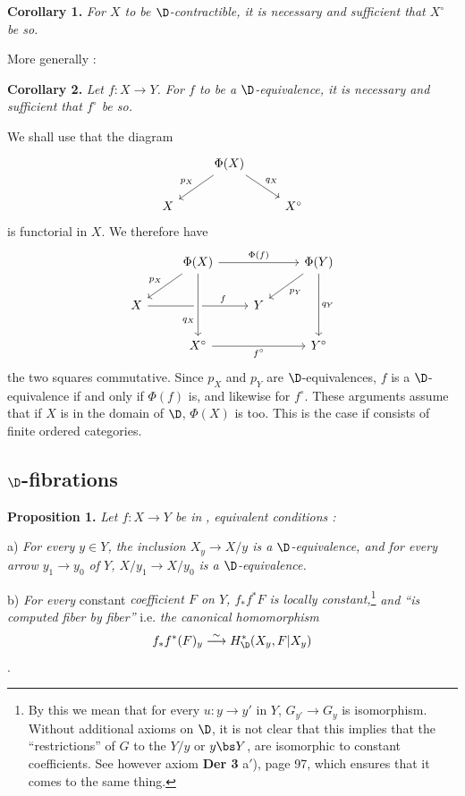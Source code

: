 \textbf{Corollary 1.} \textit{For $X$ to be $\D$-contractible, it is necessary and sufficient that $X^\circ$ be so.}

\hspace*{\parindent}More generally :

\textbf{Corollary 2.} \textit{Let $f : X \to Y$. For $f$ to be a $\D$-equivalence, it is necessary and sufficient that $f^\circ$ be so.}

\hspace*{\parindent}We shall use that the diagram
\[
\begin{tikzcd}
& \Phi(X) \arrow[dl, "p_X"'] \arrow[dr, "q_X"] & \\
X & & X^\circ
\end{tikzcd}
\]
is functorial in $X$. We therefore have
\[
\begin{tikzcd}
& \Phi(X) \arrow[rr, "\Phi(f)"] \arrow[dl, "p_X"'] & & \Phi(Y) \arrow[dl, "p_Y"] \arrow[dd, "q_Y"] \\
X \arrow[rr, "f" near end] \arrow[from=1-2, to=3-2, "q_X"' near end, crossing over] & & Y & \\
& X^\circ \arrow[rr, "f^\circ"'] & & Y^\circ
\end{tikzcd}
\]
the two squares commutative. Since $p_X$ and $p_Y$ are $\D$-equivalences, $f$ is a $\D$-equivalence if and only if $\Phi(f)$ is, and likewise for $f^\circ$. These arguments assume that if $X$ is in the domain of $\D$, $\Phi(X)$ is too. This is the case if \Dia{} consists of finite ordered categories.


\subsection*{$\D$-fibrations}

\textbf{Proposition 1.} \textit{Let $f : X \to Y$ be in} \Dia\textit{, equivalent conditions :}

\hspace*{\parindent}a) \textit{For every $y \in Y$, the inclusion $X_y \to X/y$ is a $\D$-equivalence, and for every arrow $y_1 \to y_0$ of $Y$, $X/y_1 \to X/y_0$ is a $\D$-equivalence.}

\hspace*{\parindent}b) \textit{For every} constant \textit{coefficient $F$ on $Y$, $f_*f^*F$ is locally constant,}\footnote[33]{By this we mean that for every $u : y \to y'$ in $Y$, $G_{y'} \to G_y$ is isomorphism. Without additional axioms on $\D$, it is not clear that this implies that the ``restrictions'' of $G$ to the $Y/y$ or $y\bs Y$, are isomorphic to constant coefficients. See however axiom \textbf{Der 3} a$'$), page 97, which ensures that it comes to the same thing.} \textit{and ``is computed fiber by fiber''} i.e. \textit{the canonical homomorphism}
\[
f_*f^*(F)_y \overset{\sim}{\longrightarrow} H^*_{\D}(X_y, F|X_y)
\]
.

